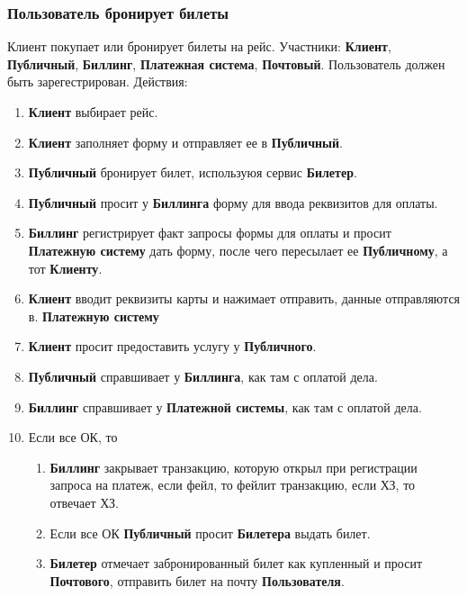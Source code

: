 \subsubsection{Пользователь бронирует билеты}
Клиент покупает или бронирует билеты на рейс. Участники:
\textbf{Клиент}, \textbf{Публичный}, \textbf{Биллинг}, 
\textbf{Платежная система}, \textbf{Почтовый}. Пользователь
должен быть зарегестрирован. Действия:
\begin{enumerate}
    \item \textbf{Клиент} выбирает рейс.
    \item \textbf{Клиент} заполняет форму и отправляет ее 
          в \textbf{Публичный}.
    \item \textbf{Публичный} бронирует билет, используюя 
          сервис \textbf{Билетер}.
    \item \textbf{Публичный} просит у \textbf{Биллинга} 
          форму для ввода реквизитов для оплаты.
    \item \textbf{Биллинг} регистрирует факт запросы формы 
          для оплаты и просит \textbf{Платежную систему} 
          дать форму, после чего пересылает ее
          \textbf{Публичному}, а тот \textbf{Клиенту}.
    \item \textbf{Клиент} вводит реквизиты карты и нажимает 
          отправить, данные отправляются в.
          \textbf{Платежную систему}
    \item \textbf{Клиент} просит предоставить услугу у 
          \textbf{Публичного}.
    \item \textbf{Публичный} справшивает у \textbf{Биллинга}, 
          как там с оплатой дела.
    \item \textbf{Биллинг} справшивает у \textbf{Платежной системы}, 
          как там с оплатой дела.
    \item Если все ОК, то 
    \begin{enumerate}
        \item \textbf{Биллинг} закрывает транзакцию, которую 
              открыл при регистрации запроса на платеж, 
              если фейл, то фейлит транзакцию, если ХЗ, 
              то отвечает ХЗ.
        \item Если все ОК \textbf{Публичный} просит 
              \textbf{Билетера} выдать билет.
        \item \textbf{Билетер} отмечает забронированный 
              билет как купленный и просит \textbf{Почтового}, 
              отправить билет на почту \textbf{Пользователя}.
    \end{enumerate}

\end{enumerate}
